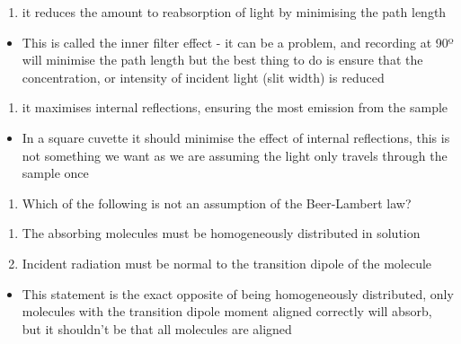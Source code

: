 \documentclass[
]{book}
\providecommand{\tightlist}{%
  \setlength{\itemsep}{0pt}\setlength{\parskip}{0pt}}
\begin{document}
\begin{enumerate}
\def\labelenumi{\alph{enumi}.}
\setcounter{enumi}{3}
\tightlist
\item
  { it reduces the amount to reabsorption of light by minimising the path length}
\end{enumerate}

\begin{itemize}
\tightlist
\item
  This is called the inner filter effect - it can be a problem, and recording at 90º will minimise the path length but the best thing to do is ensure that the concentration, or intensity of incident light (slit width) is reduced
\end{itemize}

\begin{enumerate}
\def\labelenumi{\alph{enumi}.}
\setcounter{enumi}{4}
\tightlist
\item
  it maximises internal reflections, ensuring the most emission from the sample
\end{enumerate}

\begin{itemize}
\tightlist
\item
  In a square cuvette it should minimise the effect of internal reflections, this is not something we want as we are assuming the light only travels through the sample once
\end{itemize}

\begin{enumerate}
\def\labelenumi{\arabic{enumi}.}
\setcounter{enumi}{1}
\tightlist
\item
  Which of the following is not an assumption of the Beer-Lambert law?
\end{enumerate}

\begin{enumerate}
\def\labelenumi{\alph{enumi}.}
\tightlist
\item
  The absorbing molecules must be homogeneously distributed in solution
\item
  { Incident radiation must be normal to the transition dipole of the molecule }
\end{enumerate}

\begin{itemize}
\tightlist
\item
  This statement is the exact opposite of being homogeneously distributed, only molecules with the transition dipole moment aligned correctly will absorb, but it shouldn't be that all molecules are aligned
\end{itemize}
\end{document}
